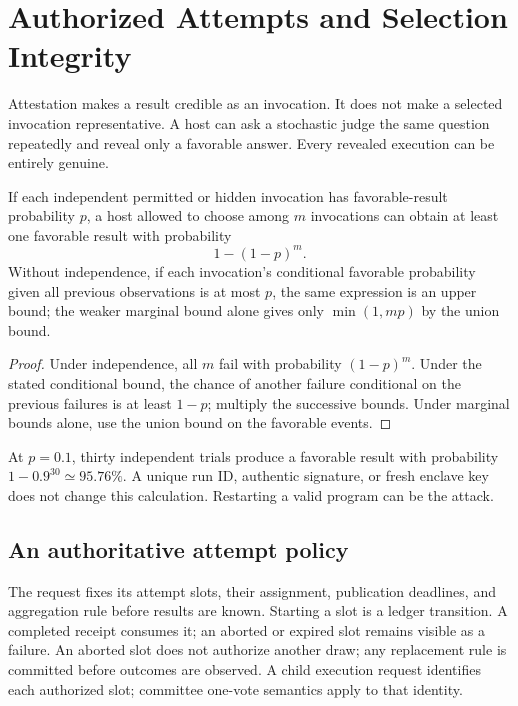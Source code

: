 \section{Authorized Attempts and Selection Integrity}
\label{sec:selection}

Attestation makes a result credible as an invocation. It does not make a selected invocation representative. A host can ask a stochastic judge the same question repeatedly and reveal only a favorable answer. Every revealed execution can be entirely genuine.

\begin{proposition}
If each independent permitted or hidden invocation has favorable-result probability $p$, a host allowed to choose among $m$ invocations can obtain at least one favorable result with probability
\[
1-(1-p)^m.
\]
Without independence, if each invocation's conditional favorable probability given all previous observations is at most $p$, the same expression is an upper bound; the weaker marginal bound alone gives only $\min(1,mp)$ by the union bound.
\end{proposition}
\begin{proof}
Under independence, all $m$ fail with probability $(1-p)^m$. Under the stated conditional bound, the chance of another failure conditional on the previous failures is at least $1-p$; multiply the successive bounds. Under marginal bounds alone, use the union bound on the favorable events.
\end{proof}

At $p=0.1$, thirty independent trials produce a favorable result with probability $1-0.9^{30}\simeq95.76\%$. A unique run ID, authentic signature, or fresh enclave key does not change this calculation. Restarting a valid program can be the attack.

\subsection{An authoritative attempt policy}

The request fixes its attempt slots, their assignment, publication deadlines, and aggregation rule before results are known. Starting a slot is a ledger transition. A completed receipt consumes it; an aborted or expired slot remains visible as a failure. An aborted slot does not authorize another draw; any replacement rule is committed before outcomes are observed. A child execution request identifies each authorized slot; committee one-vote semantics apply to that identity.

